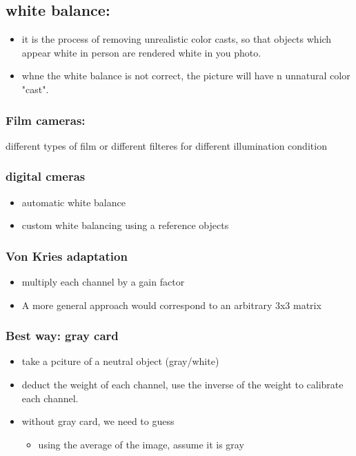 \documentclass[11pt]{article}
\begin{document}
\subsection{white balance:}
\label{sec:org12fa03e}
\begin{itemize}
\item it is the process of removing unrealistic color casts, so that objects which appear white in person are rendered white in you photo.
\item whne the white balance is not correct, the picture will have n unnatural color "cast".
\end{itemize}
\subsubsection{Film cameras:}
\label{sec:org95c38c3}
different types of film or different filteres for different illumination condition
\subsubsection{digital cmeras}
\label{sec:org0102488}
\begin{itemize}
\item automatic white balance
\item custom white balancing using a reference objects
\end{itemize}
\subsubsection{Von Kries adaptation}
\label{sec:org1327b2c}
\begin{itemize}
\item multiply each channel by a gain factor
\item A more general approach would correspond to an arbitrary 3x3 matrix
\end{itemize}
\subsubsection{Best way: gray card}
\label{sec:org68a5d51}
\begin{itemize}
\item take a pciture of a neutral object (gray/white)
\item deduct the weight of each channel, use the inverse of the weight to calibrate each channel.
\item without gray card, we need to guess
\begin{itemize}
\item using the average of the image, assume it is gray
\end{itemize}
\end{itemize}
\end{document}
